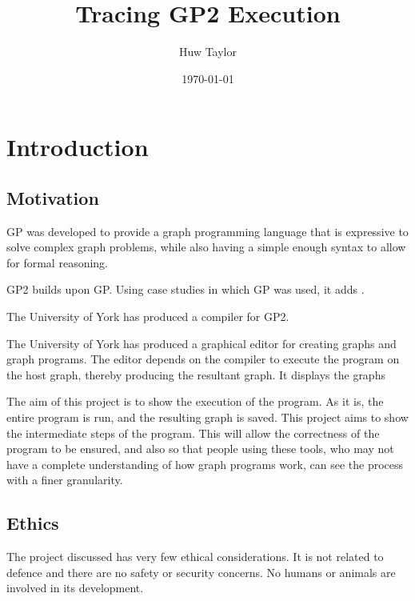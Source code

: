 \documentclass{UoYCSproject}
\author{Huw Taylor}
\title{Tracing GP2 Execution} %
\date{\today}
\begin{document}
\maketitle
\tableofcontents

\chapter{Introduction}
\section{Motivation}
GP was developed to provide a graph programming language that is expressive to solve complex graph problems, while also having a simple enough syntax to allow for formal reasoning. %

GP2 builds upon GP. Using case studies in which GP was used, it adds  \cite{gp2_design}.

The University of York has produced a compiler for GP2. %

The University of York has produced a graphical editor for creating graphs and graph programs. The editor depends on the compiler to execute the program on the host graph, thereby producing the resultant graph. It displays the graphs %

The aim of this project is to show the execution of the program. As it is, the entire program is run, and the resulting graph is saved. This project aims to show the intermediate steps of the program. This will allow the correctness of the program to be ensured, and also so that people using these tools, who may not have a complete understanding of how graph programs work, can see the process with a finer granularity.

\section{Ethics}
The project discussed has very few ethical considerations. It is not related to defence and there are no safety or security concerns. No humans or animals are involved in its development.
\end{document}
